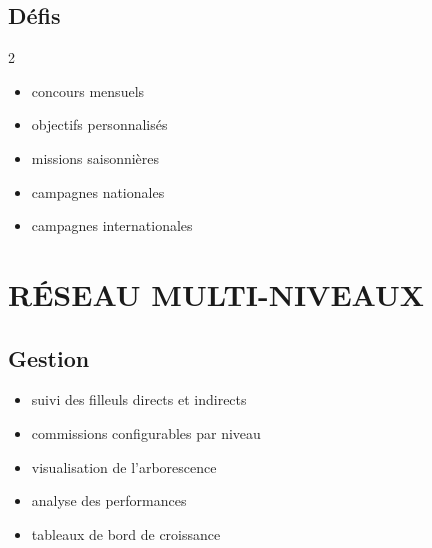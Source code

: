 \documentclass[12pt,a4paper,oneside]{book}
\begin{document}
\section{Défis}
\begin{multicols}{2}
\begin{itemize}
\item concours mensuels
\item objectifs personnalisés
\item missions saisonnières
\item campagnes nationales
\item campagnes internationales
\end{itemize}
\end{multicols}

\chapter{RÉSEAU MULTI-NIVEAUX}

\section{Gestion}
\begin{itemize}
\item suivi des filleuls directs et indirects
\item commissions configurables par niveau
\item visualisation de l'arborescence
\item analyse des performances
\item tableaux de bord de croissance
\end{itemize}

\appendix
\end{document}
